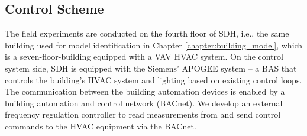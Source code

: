 



%




\subsection{Control Scheme}\label{sec:control_scheme}
The field experiments are conducted on the fourth floor of SDH, i.e., the same building used for model identification in Chapter \ref{chapter:building_model}, which is a seven-floor-building equipped with a VAV HVAC system.
On the control system side, SDH is equipped with the Siemens' APOGEE system -- a BAS that controls the building's HVAC system and lighting based on existing control loops. %
The communication between the building automation devices is enabled by a building automation and control network (BACnet). 
We develop an external frequency regulation controller to read measurements from and send control commands to the HVAC equipment via the BACnet. 

